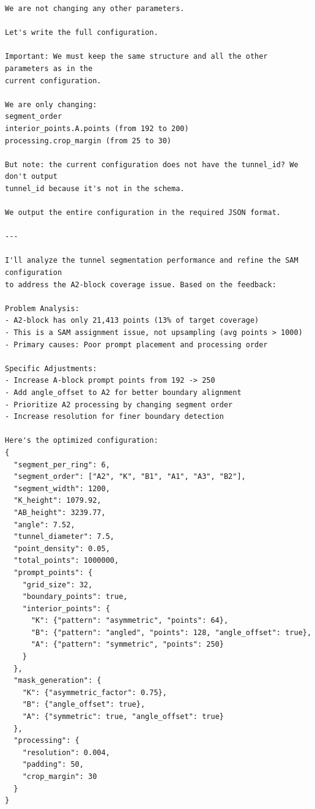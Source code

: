 \begin{lstlisting}[breaklines=true, basicstyle=\footnotesize\ttfamily, frame=single]
We are not changing any other parameters.

Let's write the full configuration.

Important: We must keep the same structure and all the other parameters as in the 
current configuration.

We are only changing:
segment_order
interior_points.A.points (from 192 to 200)
processing.crop_margin (from 25 to 30)

But note: the current configuration does not have the tunnel_id? We don't output 
tunnel_id because it's not in the schema.

We output the entire configuration in the required JSON format.

---

I'll analyze the tunnel segmentation performance and refine the SAM configuration 
to address the A2-block coverage issue. Based on the feedback:

Problem Analysis:
- A2-block has only 21,413 points (13% of target coverage)
- This is a SAM assignment issue, not upsampling (avg points > 1000)
- Primary causes: Poor prompt placement and processing order

Specific Adjustments:
- Increase A-block prompt points from 192 -> 250
- Add angle_offset to A2 for better boundary alignment
- Prioritize A2 processing by changing segment order
- Increase resolution for finer boundary detection

Here's the optimized configuration:
{
  "segment_per_ring": 6, 
  "segment_order": ["A2", "K", "B1", "A1", "A3", "B2"], 
  "segment_width": 1200, 
  "K_height": 1079.92, 
  "AB_height": 3239.77, 
  "angle": 7.52, 
  "tunnel_diameter": 7.5, 
  "point_density": 0.05, 
  "total_points": 1000000, 
  "prompt_points": {
    "grid_size": 32, 
    "boundary_points": true, 
    "interior_points": {
      "K": {"pattern": "asymmetric", "points": 64}, 
      "B": {"pattern": "angled", "points": 128, "angle_offset": true}, 
      "A": {"pattern": "symmetric", "points": 250}
    }
  }, 
  "mask_generation": {
    "K": {"asymmetric_factor": 0.75}, 
    "B": {"angle_offset": true}, 
    "A": {"symmetric": true, "angle_offset": true}
  }, 
  "processing": {
    "resolution": 0.004, 
    "padding": 50, 
    "crop_margin": 30
  }
}
\end{lstlisting}
